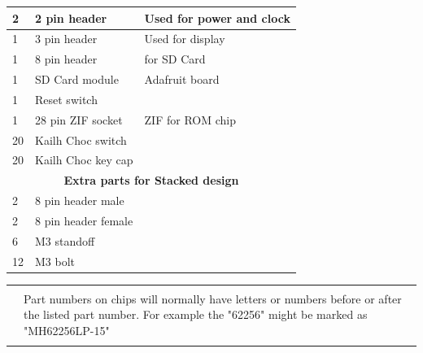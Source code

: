 \documentclass{ol-softwaremanual}
\newcommand{\Note}[1]{
\begin{table}[h]
\begin{tabular}{|p{0.1\textwidth}p{0.8\textwidth}|}
\hline
 & \\
\multicolumn{1}{|r}{\Huge\warning} & #1\\
 &  \\ \hline
\end{tabular}
\end{table}
}
\begin{document}
\begin{ffcode}
\begin{table}[H]
\begin{adjustbox}{width=0.9\textwidth,center=1\textwidth}
\begin{tabular}{|lll|}
\multicolumn{1}{|l|}{2}&\multicolumn{1}{l|}{2 pin header}&\multicolumn{1}{l|}{Used for power and clock}\\ \hline

\multicolumn{1}{|l|}{1}&\multicolumn{1}{l|}{3 pin header}&\multicolumn{1}{l|}{Used for display}\\ \hline

\multicolumn{1}{|l|}{1}&\multicolumn{1}{l|}{8 pin header}&\multicolumn{1}{l|}{for SD Card}\\ \hline

\multicolumn{1}{|l|}{1}&\multicolumn{1}{l|}{SD Card module}&\multicolumn{1}{l|}{Adafruit board}\\ \hline

\multicolumn{1}{|l|}{1}&\multicolumn{1}{l|}{Reset switch}&\multicolumn{1}{l|}{}\\ \hline

\multicolumn{1}{|l|}{1}&\multicolumn{1}{l|}{28 pin ZIF socket}&\multicolumn{1}{l|}{ZIF for ROM chip}\\ \hline

\multicolumn{1}{|l|}{20}&\multicolumn{1}{l|}{Kailh Choc switch}&\multicolumn{1}{l|}{}\\ \hline

\multicolumn{1}{|l|}{20}&\multicolumn{1}{l|}{Kailh Choc key cap}&\multicolumn{1}{l|}{}\\ \hline

\multicolumn{3}{|c|}{\textbf{Extra parts for Stacked design}}\\ \hline

\multicolumn{1}{|l|}{2}&\multicolumn{1}{l|}{8 pin header male}&\multicolumn{1}{l|}{}\\ \hline

\multicolumn{1}{|l|}{2}&\multicolumn{1}{l|}{8 pin header female}&\multicolumn{1}{l|}{}\\ \hline

\multicolumn{1}{|l|}{6}&\multicolumn{1}{l|}{M3 standoff}&\multicolumn{1}{l|}{}\\ \hline

\multicolumn{1}{|l|}{12}&\multicolumn{1}{l|}{M3 bolt}&\multicolumn{1}{l|}{}\\ \hline

\end{tabular}
\end{adjustbox}
\end{table}
\Note{Part numbers on chips will normally have letters or numbers before or after the listed part number. For example the "62256" might be marked as "MH62256LP-15"}
\clearpage


\end{ffcode}
\end{document}

